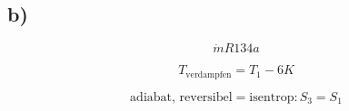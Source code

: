 

\subsection*{b)}

\[
\dot{m} R134a
\]

\[
T_{\text{verdampfen}} = T_1 - 6K
\]

\[
\text{adiabat, reversibel} = \text{isentrop} : S_3 = S_1
\]